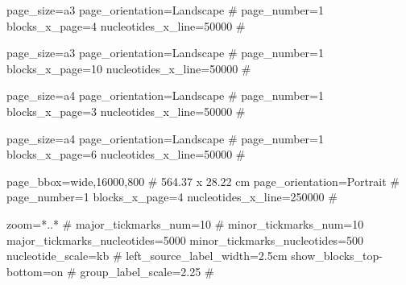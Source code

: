 \documentclass[11pt]{article}
\def\nwendcode{\endtrivlist \endgroup} %
\let\nwdocspar=\par                    %
\begin{document}
\nwenddocs{}\endmoddef
page_size=a3
page_orientation=Landscape
# page_number=1
blocks_x_page=4
nucleotides_x_line=50000
#
\nwendcode{}\nwdocspar

\nwenddocs{}\endmoddef
page_size=a3
page_orientation=Landscape
# page_number=1
blocks_x_page=10
nucleotides_x_line=50000
#
\nwendcode{}\nwdocspar

\nwenddocs{}\endmoddef
page_size=a4
page_orientation=Landscape
# page_number=1
blocks_x_page=3
nucleotides_x_line=50000
#
\nwendcode{}\nwdocspar

\nwenddocs{}\endmoddef
page_size=a4
page_orientation=Landscape
# page_number=1
blocks_x_page=6
nucleotides_x_line=50000
#
\nwendcode{}\nwdocspar

\nwenddocs{}\endmoddef
page_bbox=wide,16000,800 # 564.37 x 28.22 cm
page_orientation=Portrait
# page_number=1
blocks_x_page=4
nucleotides_x_line=250000
#
\nwendcode{}\nwdocspar

\nwenddocs{}\endmoddef
zoom=*..*
# major_tickmarks_num=10
# minor_tickmarks_num=10
major_tickmarks_nucleotides=5000
minor_tickmarks_nucleotides=500
nucleotide_scale=kb
#
left_source_label_width=2.5cm
show_blocks_top-bottom=on
#
group_label_scale=2.25
#
\nwendcode{}\nwdocspar
\end{document}
